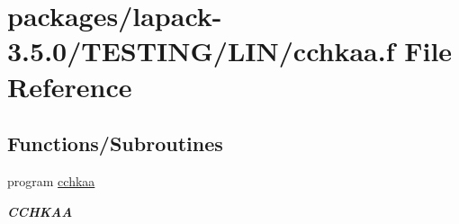 \hypertarget{cchkaa_8f}{}\section{packages/lapack-\/3.5.0/\+T\+E\+S\+T\+I\+N\+G/\+L\+I\+N/cchkaa.f File Reference}
\label{cchkaa_8f}
\subsection*{Functions/\+Subroutines}
\begin{DoxyCompactItemize}
\item 
program \hyperlink{group__complex__lin_ga87bc5eca56916f20bb104be3e18bcda0}{cchkaa}
\begin{DoxyCompactList}\small\item\em {\bfseries C\+C\+H\+K\+A\+A} \end{DoxyCompactList}\end{DoxyCompactItemize}
